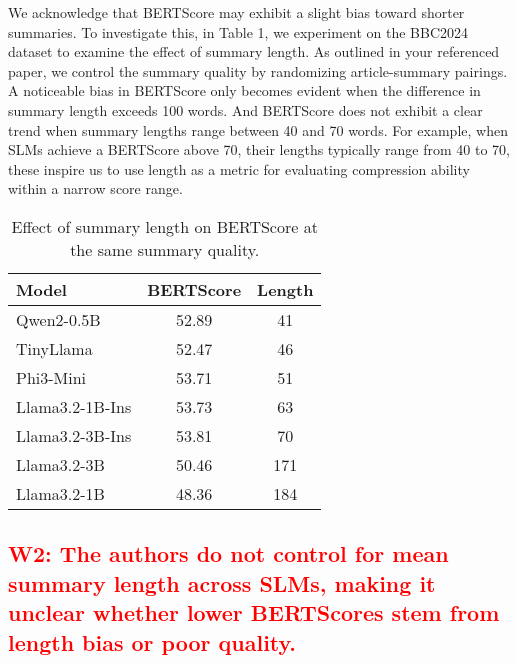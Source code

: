\documentclass[a4paper]{article}
\begin{document}
We acknowledge that BERTScore may exhibit a slight bias toward shorter summaries. To investigate this, in Table 1, we experiment on the BBC2024 dataset to examine the effect of summary length. As outlined in your referenced paper, we control the summary quality by randomizing article-summary pairings. A noticeable bias in BERTScore only becomes evident when the difference in summary length exceeds 100 words. And BERTScore does not exhibit a clear trend when summary lengths range between 40 and 70 words. For example, when SLMs achieve a BERTScore above 70, their lengths typically range from 40 to 70, these inspire us to use length as a metric for evaluating compression ability within a narrow score range.

\begin{table}[h]
\centering 
\caption{Effect of summary length on BERTScore at the same summary quality.}
\begin{tabular}{lcc}
\hline
Model           & BERTScore & Length \\ \hline
Qwen2-0.5B      & 52.89     & 41  \\
TinyLlama       & 52.47     & 46  \\
Phi3-Mini       & 53.71     & 51  \\
Llama3.2-1B-Ins & 53.73     & 63     \\
Llama3.2-3B-Ins & 53.81     & 70     \\
Llama3.2-3B     & 50.46     & 171    \\
Llama3.2-1B     & 48.36     & 184    \\ \hline
\end{tabular}
\end{table}



\subsection{\textcolor{red}{W2: The authors do not control for mean summary length across SLMs, making it unclear whether lower BERTScores stem from length bias or poor quality.}}
\end{document}
